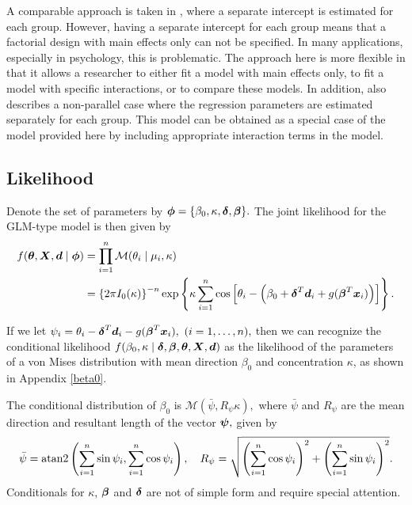 A comparable approach is taken in \citet{artes2008hypothesis}, where a separate intercept is estimated for each group. However, having a separate intercept for each group means that a factorial design  with main effects only can not be specified. In many applications, especially in psychology, this is problematic. The approach here is more flexible in that it allows a researcher to either fit a model with main effects only, to fit a model with specific interactions, or to compare these models. In addition, \citet{artes2008hypothesis} also describes a non-parallel case where the regression parameters are estimated separately for each group. This model can be obtained as a special case of the model provided here by including appropriate interaction terms in the model.



\subsection{Likelihood}

Denote the set of parameters by \( \boldsymbol{\phi} =  \{ \beta_0, \kappa, \boldsymbol{\delta}, \boldsymbol{\beta} \}.\) The joint likelihood for the GLM-type model is then given by
\begin{align}
f(\boldsymbol{\theta}, \boldsymbol{X}, \boldsymbol{d} \mid \boldsymbol{\phi}) &=  \prod_{i=1}^{n} \mathcal{M}(\theta_i \mid \mu_i, \kappa) \\
&=  \left\lbrace 2 \pi I_0(\kappa) \right\rbrace^{-n} \exp \left\lbrace \kappa \sum_{i=1}^{n} \cos \left[ \theta_i - \left( \beta_0 +  \boldsymbol{\delta}^T \boldsymbol{d}_i + g(\boldsymbol{\beta}^T \boldsymbol{x}_i) \right) \right]  \right\rbrace.
\end{align}

If we let \( \psi_i = \theta_i - \boldsymbol{\delta}^T\boldsymbol{d}_i - g(\boldsymbol{\beta}^T \boldsymbol{x}_i), ~ ( i = 1, \dots, n),\) then we can recognize the conditional likelihood \( f(\beta_0, \kappa \mid \boldsymbol{\delta}, \boldsymbol{\beta}, \boldsymbol{\theta}, \boldsymbol{X}, \boldsymbol{d}) \) as the likelihood of the parameters of a von Mises distribution with mean direction \( \beta_0 \) and concentration \( \kappa \), as shown in Appendix \ref{beta0}.

The conditional distribution of \( \beta_0 \) is \( \mathcal{M}(\bar\psi, R_{\psi} \kappa), \) where \( \bar\psi \) and \( R_\psi \) are the mean direction and resultant length of the vector \( \boldsymbol{\psi}, \) given by  \[ \bar\psi =  \operatorname{atan2} \left( \sum_{i=1}^n \sin\psi_i, \sum_{i=1}^n \cos\psi_i \right), \quad R_\psi = \sqrt{ \left( \sum_{i=1}^n \cos\psi_i \right)^2 +  \left( \sum_{i=1}^n \sin\psi_i \right)^2 }.\]
Conditionals for \( \kappa \), \( \boldsymbol{\beta} \) and \( \boldsymbol{\delta} \) are not of simple form and require special attention. \label{condbeta0}

